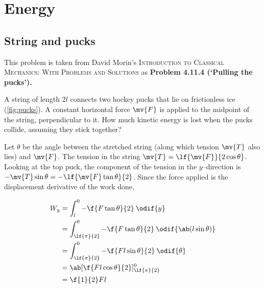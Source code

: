 \chapter{Energy}

\section{String and pucks}
\label{sec:string_and_pucks}

This problem is taken from David Morin's {\scshape Introduction to
Classical Mechanics: With Problems and Solutions}
as \bf{Problem 4.11.4} (`Pulling the pucks').

\begin{problem}
\begin{marginfigure}
	\caption{String and two pucks}
	\label{fig:pucks}
\end{marginfigure}

A string of length \(2l\) connects two hockey pucks that lie on
frictionless ice (\cref{fig:pucks}). A constant horizontal force
\(\mv{F}\) is applied
to the midpoint of the string, perpendicular to it. How much
kinetic energy is lost when the pucks collide, assuming they stick together?
\end{problem}


Let \(\theta\) be the angle between the stretched string (along which
tension \(\mv{T}\) also lies) and \(\mv{F}\). The tension in the
string \(\mv{T} = \lf{\mv{F}}{2\cos\theta}\). Looking at the top
puck, the component of the tension in the \(y\)--direction is
\(-\mv{T}\sin\theta=-\lf{\mv{F}\tan\theta}{2}\). Since the force
applied is the displacement derivative of the work done,

\begin{align*}
	W_y & = \int_{l}^{0}-\f{F\tan\theta}{2}\:\odif{y}                          \\
	    & = \int_{\lf{\pi}{2}}^{0}-\f{F\tan\theta}{2}\:\odif{\ab(l\sin\theta)} \\
	    & = \int_{\lf{\pi}{2}}^{0} -\f{Fl\sin\theta}{2}\:\odif{\theta}         \\
	    & = \ab[\f{Fl\cos\theta}{2}]_{\lf{\pi}{2}}^0                           \\
	    & = \f{1}{2}Fl
\end{align*}

